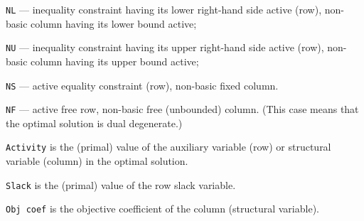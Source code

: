 {\tt NL} --- inequality constraint having its lower right-hand side
active (row), non-basic column having its lower bound active;

{\tt NU} --- inequality constraint having its upper right-hand side
active (row), non-basic column having its upper bound active;

{\tt NS} --- active equality constraint (row), non-basic fixed column.

{\tt NF} --- active free row, non-basic free (unbounded) column. (This
case means that the optimal solution is dual degenerate.)

\medskip

\noindent
{\tt Activity} is the (primal) value of the auxiliary variable (row) or
structural variable (column) in the optimal solution.

\medskip

\noindent
{\tt Slack} is the (primal) value of the row slack variable.

\medskip

\noindent
{\tt Obj coef} is the objective coefficient of the column (structural
variable).

